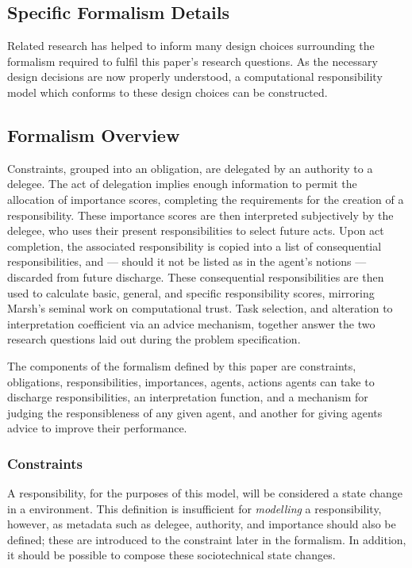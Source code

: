 \subsection{Specific Formalism Details}

Related research has helped to inform many design choices surrounding the formalism required to fulfil this paper's research questions. As the necessary design decisions are now properly understood, a computational responsibility model which conforms to these design choices can be constructed.\par

\subsection{Formalism Overview}
Constraints, grouped into an obligation, are delegated by an authority to a delegee. The act of delegation implies enough information to permit the allocation of importance scores, completing the requirements for the creation of a responsibility. These importance scores are then interpreted subjectively by the delegee, who uses their present responsibilities to select future acts. Upon act completion, the associated responsibility is copied into a list of consequential responsibilities, and --- should it not be listed as in the agent's notions --- discarded from future discharge. These consequential responsibilities are then used to calculate basic, general, and specific responsibility scores, mirroring Marsh's seminal work on computational trust. Task selection, and alteration to interpretation coefficient via an advice mechanism, together answer the two research questions laid out during the problem specification.\par

The components of the formalism defined by this paper are constraints, obligations, responsibilities, importances, agents, actions agents can take to discharge responsibilities, an interpretation function, and a mechanism for judging the responsibleness of any given agent, and another for giving agents advice to improve their performance.\par

\subsubsection{Constraints}  %
A responsibility, for the purposes of this model, will be considered a state change in a  environment. This definition is insufficient for \emph{modelling} a responsibility, however, as metadata such as delegee, authority, and importance should also be defined; these are introduced to the constraint later in the formalism. In addition, it should be possible to compose these sociotechnical state changes.\par

